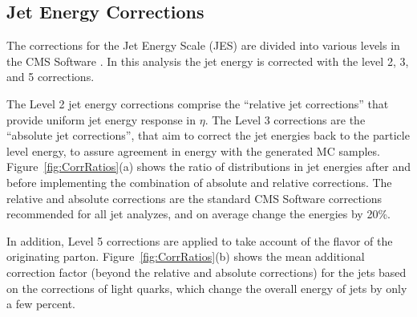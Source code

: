 
\subsection{Jet Energy Corrections}

The corrections for the Jet Energy Scale (JES) are divided into various levels in the CMS Software \cite{JES}.  
In this analysis the jet energy is corrected with the level 2, 3, and 5 corrections.

The Level 2 jet energy corrections comprise the 
``relative jet corrections'' that provide uniform jet energy response in $\eta$.  
The Level 3 corrections are the ``absolute jet corrections'', that aim to correct  the jet energies 
back to the particle level energy, to assure agreement in energy with the generated MC samples. 
Figure~\ref{fig:CorrRatios}(a) shows the ratio of distributions in jet energies after and before implementing  
the combination of absolute and relative corrections.  
The relative and absolute corrections are the standard CMS Software corrections recommended for all jet analyzes,
and on average change the energies by 20\%.

In addition, Level 5 corrections are applied to take account of the flavor of the originating parton.
Figure~\ref{fig:CorrRatios}(b) shows the mean additional correction factor (beyond the relative and absolute corrections) 
for the jets based on the corrections of light quarks, which change the overall energy of jets by only a few percent.

